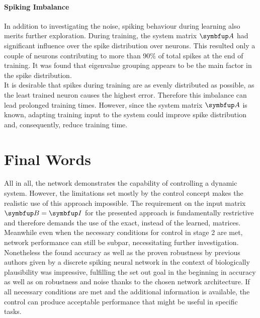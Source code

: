 \paragraph{Spiking Imbalance}
In addition to investigating the noise, spiking behaviour during learning also merits further exploration. During training, the system matrix $\bmu{A}$ had significant influence over the spike distribution over neurons. This resulted only a couple of neurons contributing to more than 90\% of total spikes at the end of training. It was found that eigenvalue grouping appears to be the main factor in the spike distribution.\\
It is desirable that spikes during training are as evenly distributed as possible, as the least trained neuron causes the highest error. Therefore this imbalance can lead prolonged training times. However, since the system matrix $\bmu{A}$ is known, adapting training input to the system could improve spike distribution and, consequently, reduce training time.\\

\section{Final Words}

All in all, the network demonstrates the capability of controlling a dynamic system. However, the limitations set mostly by the control concept makes the realistic use of this approach impossible. The requirement on the input matrix $\bmu{B} = \bmu{I}$ for the presented approach is fundamentally restrictive and therefore demands the use of the exact, instead of the learned, matrices. Meanwhile even when the necessary conditions for control in stage 2 are met, network performance can still be subpar, necessitating further investigation.\\

Nonetheless the found accuracy as well as the proven robustness by previous authors given by a discrete spiking neural network in the context of biologically plausibility was impressive, fulfilling the set out goal in the beginning in accuracy as well as on robustness and noise thanks to the chosen network architecture. If all necessary conditions are met and the additional information is available, the control can produce acceptable performance that might be useful in specific tasks.



